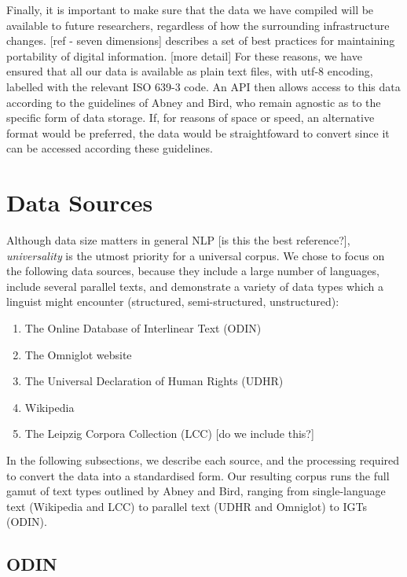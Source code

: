 \documentclass[11pt]{article}
\begin{document}
Finally, it is important to make sure that the data we have compiled will be available to future researchers, regardless of how the surrounding infrastructure changes. [ref - seven dimensions] describes a set of best practices for maintaining portability of digital information. [more detail] For these reasons, we have ensured that all our data is available as plain text files, with utf-8 encoding, labelled with the relevant ISO 639-3 code. An API then allows access to this data according to the guidelines of Abney and Bird, who remain agnostic as to the specific form of data storage. If, for reasons of space or speed, an alternative format would be preferred, the data would be straightfoward to convert since it can be accessed according these guidelines.


\section{Data Sources} \label{sec:sources}

Although data size matters in general NLP \cite{banko2001scaling} [is this the best reference?], \emph{universality} is the utmost priority for a universal corpus. We chose to focus on the following data sources, because they include a large number of languages, include several parallel texts, and demonstrate a variety of data types which a linguist might encounter (structured, semi-structured, unstructured):

\begin{enumerate}
\item The Online Database of Interlinear Text (ODIN)
\item The Omniglot website
\item The Universal Declaration of Human Rights (UDHR)
\item Wikipedia
\item The Leipzig Corpora Collection (LCC) [do we include this?]
\end{enumerate}

In the following subsections, we describe each source, and the processing required to convert the data into a standardised form. Our resulting corpus runs the full gamut of text types outlined by Abney and Bird, ranging from single-language text (Wikipedia and LCC) to parallel text (UDHR and Omniglot) to IGTs (ODIN).

\subsection{ODIN}
\end{document}
